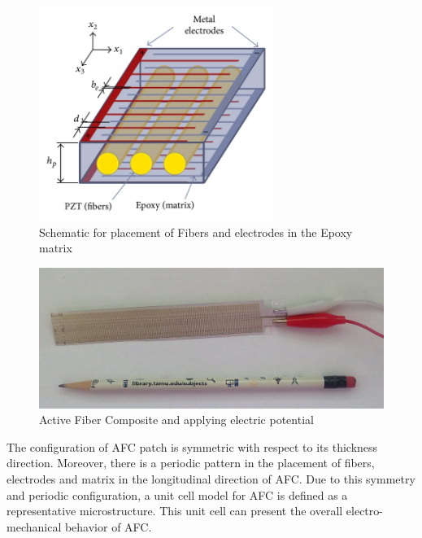 \begin{figure} 
\centering
\includegraphics[width=3.0in]{./chap_4_structural_analyses/afc_unit_cell/schematic_afc_unit_cell.jpg}
\caption{Schematic for placement of Fibers and electrodes in the Epoxy matrix \cite{jemai2014mathematical}}
\label{fig:schematic_afc_unit_cell}
\end{figure}

\begin{figure} 
\centering
\includegraphics[width=6.0in]{./chap_4_structural_analyses/afc_unit_cell/afc_picture_from_lap.png}
\caption{Active Fiber Composite and applying electric potential}
\label{fig:afc_picture_from_lap}
\end{figure}

The configuration of AFC patch is symmetric with respect to its thickness direction.
Moreover, there is a periodic pattern in the placement of fibers, electrodes and matrix in the longitudinal direction of AFC.
Due to this symmetry and periodic configuration, a unit cell model for AFC is defined as a representative microstructure.
This unit cell can present the overall electro-mechanical behavior of AFC.  
 
